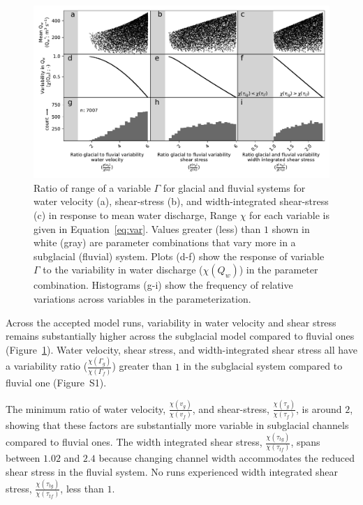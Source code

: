 \documentclass[11pt]{article}
\begin{document}
\begin{spacing}{1}
  
  \begin{center}
    \begin{figure}[H]
      \includegraphics[width=0.7\linewidth]{multi_run.pdf}
      \caption{Ratio of range of a variable $\Gamma$ for glacial and fluvial systems for water velocity  (a), shear-stress (b), and  width-integrated shear-stress (c) in response to mean water discharge,
        Range  $\chi$ for each variable is given in Equation~\ref{eq:var}. Values greater (less) than $1$ shown in white (gray) are parameter combinations that vary more in a subglacial (fluvial) system. Plots (d-f) show the response of variable $\Gamma$ to the variability in water discharge ($\chi(Q_w)$) in the parameter combination. 
        Histograms (g-i) show the frequency of relative variations across variables in the parameterization.}
      \label{fig:range}
    \end{figure}
  \end{center}
  
  Across the accepted model runs, variability in water velocity and shear stress remains substantially higher across the subglacial model compared to fluvial ones (Figure~\ref{fig:range}).
  Water velocity, shear stress, and width-integrated shear stress all have a variability ratio ($\frac{\chi(\Gamma_{g})}{\chi(\Gamma_f)}$) greater than $1$ in the subglacial  system compared to fluvial one (Figure~S1).
  
  The minimum ratio of  water velocity, $\frac{\chi(v_{g})}{\chi(v_{f})}$, and shear-stress, $\frac{\chi(\tau_{g})}{\chi(\tau_{f})}$, is around $2$, showing that these factors are substantially more variable in subglacial channels compared to fluvial ones.
  The width integrated shear stress, $\frac{\chi(\tau_{tg})}{\chi( \tau_{tf})}$, spans between $1.02$ and $2.4$ because changing channel width accommodates the reduced shear stress in the fluvial system.
  No runs experienced width integrated shear stress, $\frac{\chi(\tau_{tg})}{\chi( \tau_{tf})}$, less than $1$.
  

\end{spacing}
\end{document}

